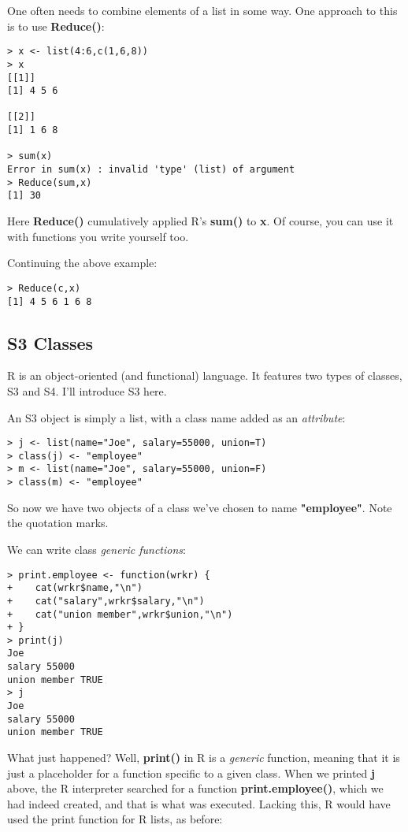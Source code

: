 One often needs to combine elements of a list in some way.  One approach
to this is to use {\bf Reduce()}:

\begin{lstlisting}
> x <- list(4:6,c(1,6,8))
> x
[[1]]
[1] 4 5 6

[[2]]
[1] 1 6 8

> sum(x)
Error in sum(x) : invalid 'type' (list) of argument
> Reduce(sum,x)
[1] 30
\end{lstlisting}

Here {\bf Reduce()} cumulatively applied R's {\bf sum()} to {\bf x}.  Of
course, you can use it with functions you write yourself too.

Continuing the above example:

\begin{lstlisting}
> Reduce(c,x)  
[1] 4 5 6 1 6 8
\end{lstlisting}

\subsection{S3 Classes}

R is an object-oriented (and functional) language.  It features two
types of classes, S3 and S4.  I'll introduce S3 here.

An S3 object is simply a list, with a class name added as an {\it
attribute}:

\begin{lstlisting}
> j <- list(name="Joe", salary=55000, union=T)
> class(j) <- "employee"
> m <- list(name="Joe", salary=55000, union=F)
> class(m) <- "employee"
\end{lstlisting}

So now we have two objects of a class we've chosen to name {\bf
"employee"}.  Note the quotation marks.

We can write class {\it generic functions}:

\begin{lstlisting}
> print.employee <- function(wrkr) {
+    cat(wrkr$name,"\n")
+    cat("salary",wrkr$salary,"\n")
+    cat("union member",wrkr$union,"\n")
+ }
> print(j)
Joe 
salary 55000 
union member TRUE 
> j
Joe 
salary 55000 
union member TRUE 
\end{lstlisting}

What just happened?  Well, {\bf print()} in R is a {\it generic}
function, meaning that it is just a placeholder for a function specific
to a given class.  When we printed {\bf j} above, the R interpreter
searched for a function {\bf print.employee()}, which we had indeed
created, and that is what was executed.  Lacking this, R would have used
the print function for R lists, as before:

